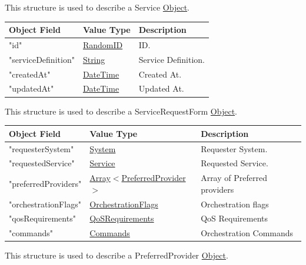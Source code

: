\documentclass[a4paper]{arrowhead}
\newcommand{\mref}[1]{{\textcolor{ArrowheadPurple}{\hyperref[sec:model:#1]{#1}}}}
\newcommand{\pref}[1]{{\textcolor{ArrowheadGrey}{\hyperref[sec:model:primitives:#1]{#1}}}}
\begin{document}

This structure is used to describe a Service \pref{Object}. 

\begin{table}[ht!]
\begin{tabularx}{\textwidth}{| p{5cm} | p{6cm} | X |} \hline
\rowcolor{gray!33} Object Field & Value Type      & Description \\ \hline
"id"                 & \pref{RandomID} & ID. \\ \hline
"serviceDefinition"  & \pref{String}   & Service Definition. \\ \hline
"createdAt"          & \pref{DateTime} & Created At. \\ \hline
"updatedAt"          & \pref{DateTime} & Updated At. \\ \hline

\end{tabularx}
\end{table}


This structure is used to describe a ServiceRequestForm \pref{Object}. 

\begin{table}[ht!]
\begin{tabularx}{\textwidth}{| p{5cm} | p{6cm} | X |} \hline
\rowcolor{gray!33} Object Field & Value Type                      & Description \\ \hline
"requesterSystem"                   & \pref{System}     & Requester System. \\ \hline
"requestedService"                  & \pref{Service}   & Requested Service. \\ \hline
"preferredProviders"                & \pref{Array}$<$\mref{PreferredProvider}$>$   & Array of Preferred providers \\ \hline
"orchestrationFlags"                & \pref{OrchestrationFlags}     & Orchestration flags \\ \hline
"qosRequirements"                   & \pref{QoSRequirements}     & QoS Requirements \\ \hline
"commands"                           & \pref{Commands}     & Orchestration Commands \\ \hline
\end{tabularx}
\end{table}


This structure is used to describe a PreferredProvider \pref{Object}. 
\end{document}
